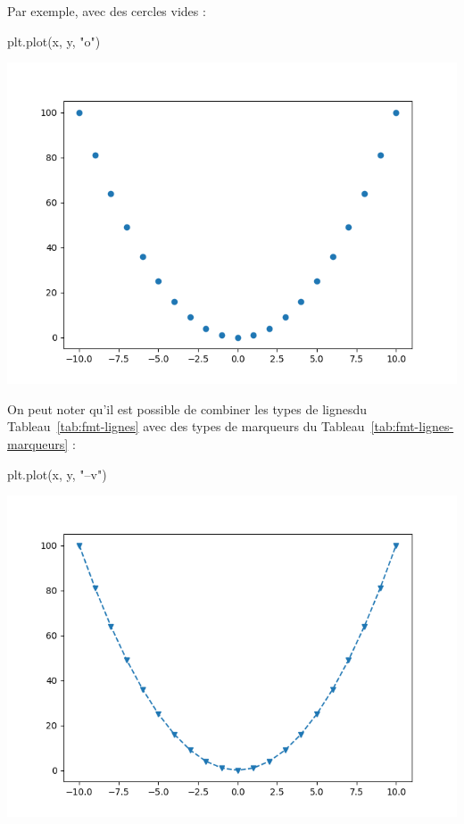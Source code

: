 \documentclass[12pt,]{book}
\newenvironment{Shaded}{\begin{snugshade}}{\end{snugshade}}
\newcommand{\StringTok}[1]{\textcolor[rgb]{0.31,0.60,0.02}{#1}}
\newcommand{\NormalTok}[1]{#1}
\numberwithin{equation}{section}
\numberwithin{countremarque}{section}
\begin{document}
Par exemple, avec des cercles vides :

\begin{Shaded}
\begin{Highlighting}[]
\NormalTok{plt.plot(x, y, }\StringTok{"o"}\NormalTok{)}
\end{Highlighting}
\end{Shaded}

\begin{center}\includegraphics[width=9.03in]{figs/pyplot/lignes_cercles} \end{center}

On peut noter qu'il est possible de combiner les types de lignesdu
Tableau~\ref{tab:fmt-lignes} avec des types de marqueurs du
Tableau~\ref{tab:fmt-lignes-marqueurs} :

\begin{Shaded}
\begin{Highlighting}[]
\NormalTok{plt.plot(x, y, }\StringTok{"--v"}\NormalTok{)}
\end{Highlighting}
\end{Shaded}

\begin{center}\includegraphics[width=9.03in]{figs/pyplot/lignes_tirets_triangles} \end{center}
\end{document}
